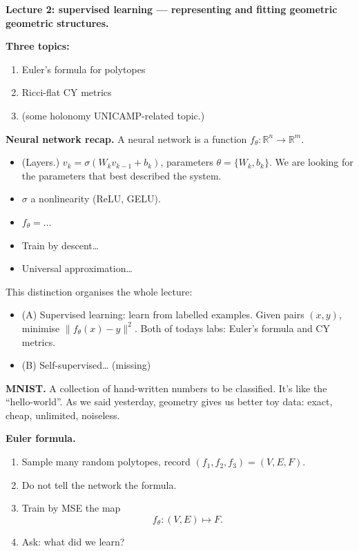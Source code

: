 \medskip\noindent
\medskip\noindent
{\bf Lecture 2: supervised learning ---
representing and fitting geometric geometric
structures.}

\medskip\noindent
{\bf Three topics:} 
\begin{enumerate}
\item Euler's formula for polytopes
\item Ricci-flat CY metrics
\item (some holonomy UNICAMP-related topic.)
\end{enumerate}

\medskip\noindent
{\bf Neural network recap.}
A neural network is a function
$f_{\theta}:\mathbb{R}^n \to \mathbb{R}^m$.
\begin{itemize}
\item (Layers.) $v_k = \sigma(W_k v_{k-1}
+b_k)$, parameters $\theta=\{W_k,b_k\}$.
We are looking for the parameters that best
described the system.
\item  $\sigma$ a nonlinearity (ReLU, GELU).
\item $f_{\theta}=…$
\item  Train by descent…
\item Universal approximation…
\end{itemize}

\medskip\noindent
This distinction organises the whole
lecture:
\begin{itemize}
\item (A) Supervised learning: learn from
labelled examples. Given pairs $(x,y)$,
minimise $\|f_{\theta}(x)-y\|^2$.
Both of todays labs: Euler's formula
and CY metrics.

\item (B) Self-supervised… (missing)
\end{itemize}

\medskip\noindent
{\bf MNIST.} A collection of hand-written
numbers to be classified. It's like the
``hello-world''.
As we said yesterday, geometry gives us
better toy data: exact, cheap, unlimited,
noiseless.

\medskip\noindent
{\bf Euler formula.}
\begin{enumerate}
\item Sample many random polytopes, record
$(f_1,f_2,f_3)= (V,E,F)$.
\item Do not tell the network the formula.
\item Train by MSE the map
$$
f_\theta:(V,E) \mapsto F.
$$
\item Ask: what did we learn?
\end{enumerate}

